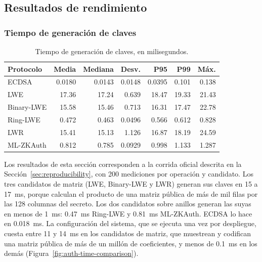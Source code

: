 
\subsection{Resultados de rendimiento}
\label{sec:performance-results}

\subsubsection{Tiempo de generación de claves}

\begin{table}[H]
\centering
\caption{Tiempo de generación de claves, en milisegundos.}
\label{tab:keygen-time}
\small
\begin{tabular}{lrrrrrr}
\toprule
\textbf{Protocolo} &
\textbf{Media} &
\textbf{Mediana} &
\textbf{Desv.} &
\textbf{P95} &
\textbf{P99} &
\textbf{Máx.} \\
\midrule

ECDSA      & 0.0180 & 0.0143 & 0.0148 & 0.0395 & 0.101 & 0.138 \\
LWE        & 17.36 & 17.24 & 0.639 & 18.47 & 19.33 & 21.43 \\
Binary-LWE & 15.58 & 15.46 & 0.713 & 16.31 & 17.47 & 22.78 \\
Ring-LWE   & 0.472 & 0.463 & 0.0496 & 0.566 & 0.612 & 0.828 \\
LWR        & 15.41 & 15.13 & 1.126 & 16.87 & 18.19 & 24.59 \\
ML-ZKAuth  & 0.812 & 0.785 & 0.0929 & 0.998 & 1.133 & 1.287 \\

\bottomrule
\end{tabular}
\end{table}

Los resultados de esta sección corresponden a la corrida oficial descrita en la Sección~\ref{sec:reproducibility}, con 200 mediciones por operación y candidato. Los tres candidatos de matriz (LWE, Binary-LWE y LWR) generan sus claves en 15 a 17~ms, porque calculan el producto de una matriz pública de más de mil filas por las 128 columnas del secreto. Los dos candidatos sobre anillos generan las suyas en menos de 1~ms: 0.47~ms Ring-LWE y 0.81~ms ML-ZKAuth. ECDSA lo hace en 0.018~ms. La configuración del sistema, que se ejecuta una vez por despliegue, cuesta entre 11 y 14~ms en los candidatos de matriz, que muestrean y codifican una matriz pública de más de un millón de coeficientes, y menos de 0.1~ms en los demás (Figura~\ref{fig:auth-time-comparison}).


